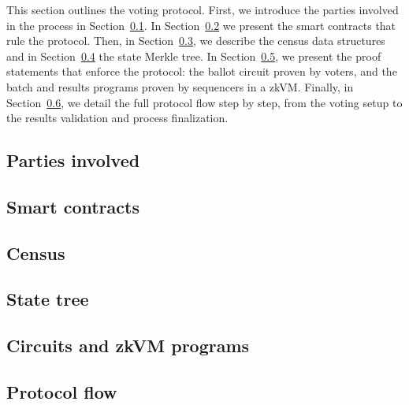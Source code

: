 
This section outlines the \davinci voting protocol. 
First, we introduce the parties involved in the process in Section~\ref{sec:vocdoni-protocol:parties}. 
In Section~\ref{sec:vocdoni-protocol:smart-contracts} we present the smart contracts that rule the \davinci protocol. 
Then, in Section~\ref{sec:vocdoni-protocol:census}, we describe the census data structures and in Section~\ref{sec:vocdoni-protocol:state-tree} the state Merkle tree. 
In Section~\ref{sec:vocdoni-protocol:circuits}, we present the proof statements that enforce the protocol: the ballot circuit proven by voters, and the batch and results programs proven by sequencers in a \ac{zkVM}. 
Finally, in Section~\ref{sec:vocdoni-protocol:flow}, we detail the full protocol flow step by step, from the voting setup to the results validation and process finalization.

\subsection{Parties involved}
\label{sec:vocdoni-protocol:parties}


\subsection{Smart contracts}
\label{sec:vocdoni-protocol:smart-contracts}


\subsection{Census}
\label{sec:vocdoni-protocol:census}


\subsection{State tree}
\label{sec:vocdoni-protocol:state-tree}


\subsection{Circuits and zkVM programs}
\label{sec:vocdoni-protocol:circuits}


\subsection{Protocol flow}
\label{sec:vocdoni-protocol:flow}
